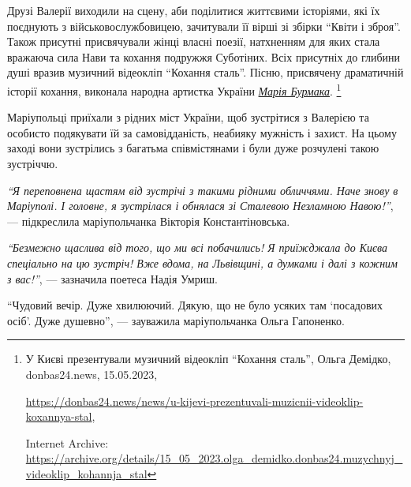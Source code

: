 
Друзі Валерії виходили на сцену, аби поділитися життєвими історіями, які їх
поєднують з військовослужбовицею, зачитували її вірші зі збірки \enquote{Квіти і
зброя}. Також присутні присвячували жінці власні поезії, натхненням для яких
стала вражаюча сила Нави та кохання подружжя Суботіних. Всіх присутніх до
глибини душі вразив музичний відеокліп \enquote{Кохання сталь}. Пісню, присвячену
драматичній історії кохання, виконала народна артистка України \href{https://archive.org/details/15_05_2023.olga_demidko.donbas24.muzychnyj_videoklip_kohannja_stal}{\emph{Марія Бурмака}}.%
\footnote{У Києві презентували музичний відеокліп \enquote{Кохання сталь}, Ольга Демідко, donbas24.news, 15.05.2023, \par%
\url{https://donbas24.news/news/u-kijevi-prezentuvali-muzicnii-videoklip-koxannya-stal}, \par%
Internet Archive: \url{https://archive.org/details/15_05_2023.olga_demidko.donbas24.muzychnyj_videoklip_kohannja_stal}%
}

Маріупольці приїхали з рідних міст України, щоб зустрітися з Валерією та
особисто подякувати їй за самовідданість, неабияку мужність і захист. На цьому
заході вони зустрілись з багатьма співмістянами і були дуже розчулені такою
зустріччю.

\begin{leftbar}
\emph{\enquote{Я переповнена щастям від зустрічі з такими рідними обличчями. Наче знову в
Маріуполі. І головне, я зустрілася і обнялася зі Сталевою Незламною
Навою!}}, — підкреслила маріупольчанка Вікторія Константіновська.
\end{leftbar}

\begin{leftbar}
\emph{\enquote{Безмежно щаслива від того, що ми всі побачились! Я приїжджала до Києва
спеціально на цю зустріч! Вже вдома, на Львівщині, а думками і далі з кожним з
вас!}}, — зазначила поетеса Надія Умриш.
\end{leftbar}

\begin{leftbar}
\enquote{Чудовий вечір. Дуже хвилюючий. Дякую, що не було усяких там
\enquote{посадових осіб}. Дуже душевно}, — зауважила маріупольчанка Ольга
Гапоненко. 
\end{leftbar}


